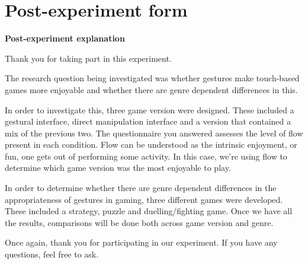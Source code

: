 \newpage


\newpage
\section{Post-experiment form}
\label{postEForm}

{\bf \large Post-experiment explanation}
\parindent 0cm
\parskip 0.5cm

Thank you for taking part in this experiment.

The research question being investigated was whether gestures make touch-based games more enjoyable and whether there are genre dependent differences in this.

In order to investigate this, three game version were designed. These included a gestural interface, direct manipulation interface and a version that contained a mix of the previous two. The questionnaire you answered assesses the level of flow present in each condition. Flow can be understood as the intrinsic enjoyment, or fun, one gets out of performing some activity. In this case, we're using flow to determine which game version was the most enjoyable to play.

In order to determine whether there are genre dependent differences in the appropriateness of gestures in gaming, three different games were developed. These included a strategy, puzzle and duelling/fighting game. Once we have all the results, comparisons will be done both across game version and genre.

Once again, thank you for participating in our experiment. If you have any questions, feel free to ask.

\parindent 1cm
\parskip 0.0cm
